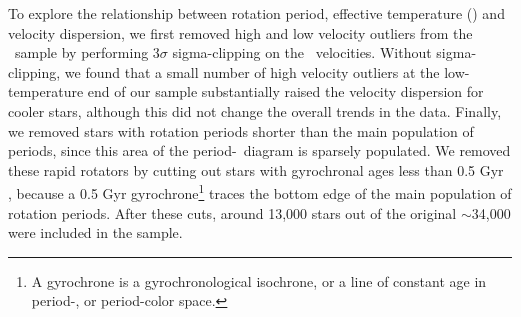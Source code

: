 To explore the relationship between rotation period, effective temperature
(\teff ) and velocity dispersion, we first removed high and low velocity
outliers from the \mct\ sample by performing 3$\sigma$ sigma-clipping on the
\vb\ velocities.
Without sigma-clipping, we found that a small number of high velocity
outliers at the low-temperature end of our sample substantially raised the
velocity dispersion for cooler stars, although this did not change the overall
trends in the data.
Finally, we removed stars with rotation periods shorter than the main
population of periods, since this area of the period-\teff\ diagram is
sparsely populated.
We removed these rapid rotators by cutting out stars with gyrochronal ages
less than 0.5 Gyr \citep[based on the][gyro-model]{angus2019}, because a 0.5
Gyr gyrochrone\footnote{A gyrochrone is a gyrochronological isochrone, or a
line of constant age in period-\teff, or period-color space.} traces the
bottom edge of the main population of rotation periods.
After these cuts, around 13,000 stars out of the original $\sim$34,000 were
included in the sample.

